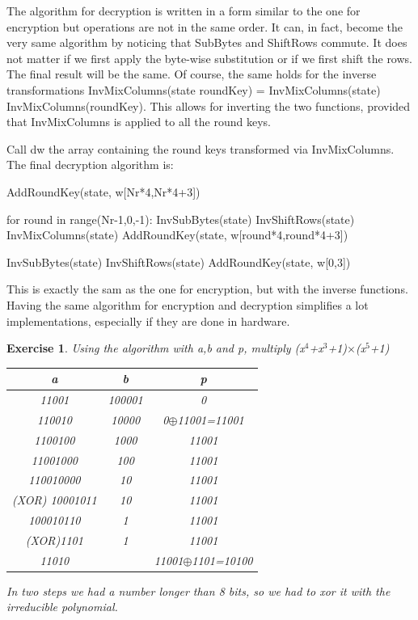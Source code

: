 \documentclass[a4paper, 12pt]{report}
\newtheorem{exercise}{\textbf{Exercise}}
\begin{document}
The algorithm for decryption is written in a form similar to the one for encryption but operations are not in the same order. It can, in fact, become the very same algorithm by noticing that SubBytes and ShiftRows commute. It does not matter if we first apply the byte-wise substitution or if we first shift the rows. The final result will be the same. Of course, the same holds for the inverse transformations InvMixColumns(state roundKey) = InvMixColumns(state) InvMixColumns(roundKey). This allows for inverting the two functions, provided that InvMixColumns is applied to all the round keys.

Call dw the array containing the round keys transformed via InvMixColumns. The final decryption algorithm is:
\begin{python}
	AddRoundKey(state, w[Nr*4,Nr*4+3])
	
	for round in range(Nr-1,0,-1):
	InvSubBytes(state)
	InvShiftRows(state)
	InvMixColumns(state)
	AddRoundKey(state, w[round*4,round*4+3])
	
	InvSubBytes(state)
	InvShiftRows(state)
	AddRoundKey(state, w[0,3])
\end{python}

This is exactly the sam as the one for encryption, but with the inverse functions. Having the same algorithm for encryption and decryption simplifies a lot implementations, especially if they are done in hardware.

\begin{exercise}
	Using the algorithm with a,b and p, multiply (x$^4$+x$^3$+1)$\times$(x$^5$+1)
	
	\begin{table}[H]
		\centering
		\begin{tabular}{|c|c|c|}
			\hline
			\textbf{a} & \textbf{b} & \textbf{p} \\ \hline
			11001 & 100001 & 0\\
			110010 & 10000 & 0$\oplus$11001=11001\\
			1100100 & 1000 & 11001\\
			11001000 & 100 & 11001\\
			110010000 & 10 & 11001\\
			(XOR) 10001011 & 10 & 11001\\
			100010110 & 1 & 11001\\
			(XOR)1101 & 1 & 11001\\
			11010 & & 11001$\oplus$1101=10100\\
			\hline
		\end{tabular}
	\end{table}
	In two steps we had a number longer than 8 bits, so we had to xor it with the irreducible polynomial.
\end{exercise}
\end{document}

